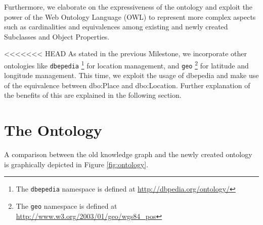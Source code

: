 \documentclass[runningheads,a4paper]{../../StyleFiles/llncs}
\begin{document}
Furthermore, we elaborate on the expressiveness of the ontology and exploit the power of the Web Ontology Language (OWL) to represent more complex aspects such as cardinalities and equivalences among existing and newly created Subclasses and Object Properties.

<<<<<<< HEAD
As stated in the previous Milestone, we incorporate other ontologies like \texttt{dbepedia} \footnote{The \texttt{dbepedia} namespace is defined at \url{http://dbpedia.org/ontology/}} for location management, and \texttt{geo} \footnote{The \texttt{geo} namespace is defined at \url{http://www.w3.org/2003/01/geo/wgs84_pos}} for latitude and longitude management. This time, we exploit the usage of dbepedia and make use of the equivalence between dbo:Place and dbo:Location. Further explanation of the benefits of this are explained in the following section.

\section{The Ontology}
A comparison between the old knowledge graph and the newly created ontology is graphically depicted in Figure \ref{fig:ontology}. 
\end{document}
